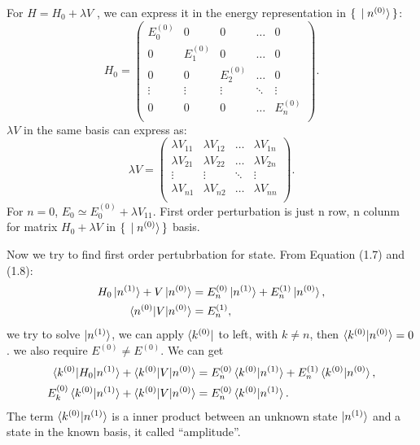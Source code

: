 \documentclass[UTF8,12pt]{article} %
\begin{document}
For $H=H_0+\lambda V$ , we can express it in the energy representation in $\set{\ket{n^{(0)}}}$:
\[ H_0 = 
\begin{pmatrix}
     E^{(0)}_0& 0         & 0         & \ldots    & 0         \\
     0        & E^{(0)}_1 & 0         & \ldots    & 0         \\
     0        & 0         & E^{(0)}_2 & \ldots    & 0         \\
     \vdots   & \vdots    & \vdots    & \ddots    & \vdots    \\
     0        & 0         & 0         & \ldots    & E^{(0)}_n \\
\end{pmatrix} . \]
$\lambda V$ in the same basis can express as:
\[ \lambda V = 
\begin{pmatrix}
    \lambda V_{11} & \lambda V_{12} & \ldots & \lambda V_{1n} \\
    \lambda V_{21} & \lambda V_{22} & \ldots & \lambda V_{2n} \\
    \vdots         & \vdots         & \ddots & \vdots         \\
    \lambda V_{n1} & \lambda V_{n2} & \ldots & \lambda V_{nn} \\
\end{pmatrix} . \]
For $n=0$, $E_0\simeq E^{(0)}_0+\lambda V_{11}$. First order perturbation is just n row, n colunm for matrix $H_0+\lambda V$ in $\set{\ket{n^{(0)}}}$ basis.

Now we try to find first order pertubrbation for state. From Equation (1.7) and (1.8):
\begin{equation*}
    \begin{aligned}
        H_0\ket{n^{(1)}}+V\ket{n^{(0)}}&=E^{(0)}_n\ket{n^{(1)}}+E^{(1)}_n\ket{n^{(0)}} , \\
        \braket{n^{(0)}|V|n^{(0)}}&=E^{(1)}_n ,
    \end{aligned}
\end{equation*}
we try to solve $\ket{n^{(1)}}$, we can apply $\bra{k^{(0)}}$ to left, with $k\neq n$, then $\braket{k^{(0)}|n^{(0)}}=0$. we also require $E^{(0)}\neq E^{(0)}$. We can get 
\begin{equation} 
    \begin{aligned}
    \braket{k^{(0)}|H_0|n^{(1)}}+\braket{k^{(0)}|V|n^{(0)}}&=E^{(0)}_n\braket{k^{(0)}|n^{(1)}}+E^{(1)}_n\braket{k^{(0)}|n^{(0)}} , \\
    E^{(0)}_k\braket{ k^{(0)} | n^{(1)} }+\braket{k^{(0)}|V|n^{(0)}}&=E^{(0)}_n\braket{k^{(0)} | n^{(1)}} . 
    \end{aligned}
\end{equation}
The term $\braket{k^{(0)} | n^{(1)}}$ is a inner product between an unknown state $\ket{n^{(1)}}$ and a state in the known basis, it called ``amplitude''.
\end{document}
